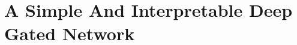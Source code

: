 \section{A Simple And Interpretable Deep Gated  Network}
\begin{figure}[h]
\centering
{}
\end{figure}

